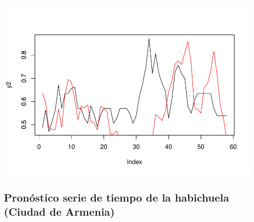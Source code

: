 \documentclass[
]{book}
\begin{document}
\includegraphics{bookdown-demo_files/figure-latex/unnamed-chunk-191-1.pdf}

\hypertarget{pronuxf3stico-serie-de-tiempo-de-la-habichuela-ciudad-de-armenia-3}{%
\subsection{Pronóstico serie de tiempo de la habichuela (Ciudad de Armenia)}\label{pronuxf3stico-serie-de-tiempo-de-la-habichuela-ciudad-de-armenia-3}}
\end{document}
